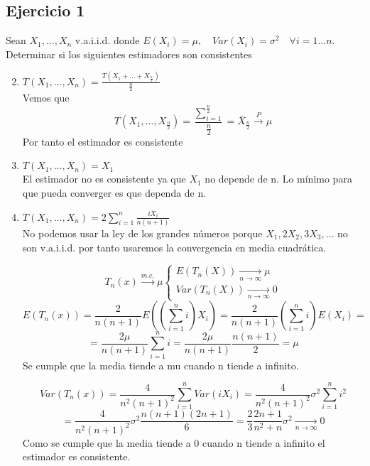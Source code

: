 
\subsection*{Ejercicio 1}

Sean $X_1, \dots, X_n$ v.a.i.i.d. donde $E(X_i)=\mu,\quad Var(X_i)=\sigma^2 \quad \forall i=1 \dots n$. Determinar si los siguientes estimadores son consistentes
\begin{enumerate}[label=\alph*)]\setcounter{enumi}{1}
    \item $T(X_1,\dots,X_n)=\frac{T(X_1 + \dots + X_{\frac{n}{2}})}{\frac{n}{2}}$\\
          Vemos que
          \[
              T(X_1,\dots,X_{\frac{n}{2}}) = \frac{\sum_{i=1}^{\frac{n}{2}}}{\frac{n}{2}} = \bar{X}_{\frac{n}{2}} \xrightarrow{P} \mu
          \]
          Por tanto el estimador es consistente

    \item $T(X_1,\dots,X_n)=X_1$\\
          El estimador no es consistente ya que $X_1$ no depende de n. Lo mínimo para que pueda converger es que dependa de n.

    \item $T(X_1,\dots,X_n)=2  \sum_{i=1}^{n}\frac{i  X_i}{n(n+1)}$\\
          No podemos usar la ley de los grandes números porque $X_1, 2X_2, 3X_3, \dots$ no son v.a.i.i.d. por tanto usaremos la convergencia en media cuadrática.

          \[
              T_n(x) \xrightarrow{m.c.} \mu
              \left\{
              \begin{array}{l}
                  E(T_n(X)) \xrightarrow[n \to \infty]{} \mu \\
                  Var(T_n(X)) \xrightarrow[n \to \infty]{} 0
              \end{array}
              \right.
          \]
          \[
              E(T_n(x))=\frac{2}{n  (n+1)}  E((\sum_{i=1}^{n} i)  X_i)=\frac{2}{n  (n+1)}  (\sum_{i=1}^{n} i)   E(X_i)=
          \]
          \[
              =\frac{2  \mu}{n  (n+1)}  \sum_{i=1}^{n} i=\frac{2  \mu}{n  (n+1)} \frac{n  (n+1)}{2}= \mu
          \]
          Se cumple que la media tiende a mu cuando n tiende a infinito.

          \[
              Var(T_n(x))=\frac{4}{n^2  (n+1)^2}  \sum_{i=1}^{n} Var(i X_i)= \frac{4}{n^2  (n+1)^2}  \sigma^2  \sum_{i=1}^{n} i^2
          \]
          \[
              =\frac{4}{n^2  (n+1)^2}  \sigma^2  \frac{n  (n+1)  (2n+1)}{6}=\frac{2}{3} \frac{2n+1}{n^2+n} \sigma^2 \xrightarrow[n \to \infty]{} 0
          \]
          Como se cumple que la media tiende a 0 cuando n tiende a infinito el estimador es consistente.
\end{enumerate}

